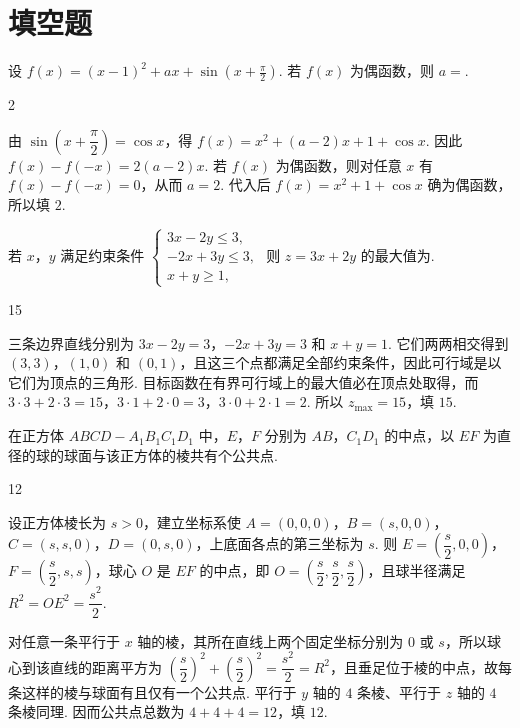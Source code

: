 \section{填空题}

\begin{problem}
设 \( f(x)=\left( x-1 \right)^2+ax+\sin\left( x+\frac{\pi}{2} \right) \). 若 \( f(x) \) 为偶函数，则 \( a= \)\fillinblank{}.
\end{problem}

\begin{answer}
2
\end{answer}

\begin{solution}
由 \(\sin\left(x+\dfrac\pi2\right)=\cos x\)，得 \(f(x)=x^2+(a-2)x+1+\cos x\). 因此
\(f(x)-f(-x)=2(a-2)x\). 若 \(f(x)\) 为偶函数，则对任意 \(x\) 有 \(f(x)-f(-x)=0\)，从而 \(a=2\). 代入后 \(f(x)=x^2+1+\cos x\) 确为偶函数，所以填 \(2\).
\end{solution}

\begin{problem}
若 \(x\)，\(y\) 满足约束条件
\(\begin{cases}
3x-2y\le 3,\\
-2x+3y\le 3,\\
x+y\ge 1,
\end{cases}\)
则 \( z=3x+2y \) 的最大值为\fillinblank{}.
\end{problem}

\begin{answer}
15
\end{answer}

\begin{solution}
三条边界直线分别为 \(3x-2y=3\)，\(-2x+3y=3\) 和 \(x+y=1\). 它们两两相交得到
\((3,3)\)，\((1,0)\) 和 \((0,1)\)，且这三个点都满足全部约束条件，因此可行域是以它们为顶点的三角形. 目标函数在有界可行域上的最大值必在顶点处取得，而
\(3\cdot3+2\cdot3=15\)，\(3\cdot1+2\cdot0=3\)，\(3\cdot0+2\cdot1=2\). 所以 \(z_{\max}=15\)，填 \(15\).
\end{solution}

\begin{problem}
在正方体 \( ABCD-A_1B_1C_1D_1 \) 中，\(E\)，\(F\) 分别为 \(AB\)，\(C_1D_1\) 的中点，以 \(EF\) 为直径的球的球面与该正方体的棱共有\fillinblank{}个公共点.
\end{problem}

\begin{answer}
12
\end{answer}

\begin{solution}
设正方体棱长为 \(s>0\)，建立坐标系使 \(A=(0,0,0)\)，\(B=(s,0,0)\)，\(C=(s,s,0)\)，\(D=(0,s,0)\)，上底面各点的第三坐标为 \(s\). 则
\(E=(\dfrac{s}{2},0,0)\)，\(F=(\dfrac{s}{2},s,s)\)，球心 \(O\) 是 \(EF\) 的中点，即 \(O=(\dfrac{s}{2},\dfrac{s}{2},\dfrac{s}{2})\)，且球半径满足 \(R^2=OE^2=\dfrac{s^2}{2}\).

对任意一条平行于 \(x\) 轴的棱，其所在直线上两个固定坐标分别为 \(0\) 或 \(s\)，所以球心到该直线的距离平方为 \((\dfrac{s}{2})^2+(\dfrac{s}{2})^2=\dfrac{s^2}{2}=R^2\)，且垂足位于棱的中点，故每条这样的棱与球面有且仅有一个公共点. 平行于 \(y\) 轴的 \(4\) 条棱、平行于 \(z\) 轴的 \(4\) 条棱同理. 因而公共点总数为 \(4+4+4=12\)，填 \(12\).
\end{solution}

